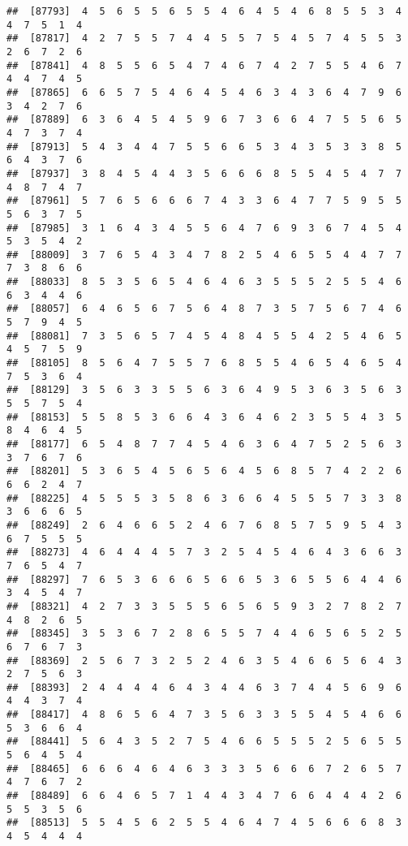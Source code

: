 \documentclass[
]{book}
\begin{document}
\begin{verbatim}
##  [87793]  4  5  6  5  5  6  5  5  4  6  4  5  4  6  8  5  5  3  4  4  7  5  1  4
##  [87817]  4  2  7  5  5  7  4  4  5  5  7  5  4  5  7  4  5  5  3  2  6  7  2  6
##  [87841]  4  8  5  5  6  5  4  7  4  6  7  4  2  7  5  5  4  6  7  4  4  7  4  5
##  [87865]  6  6  5  7  5  4  6  4  5  4  6  3  4  3  6  4  7  9  6  3  4  2  7  6
##  [87889]  6  3  6  4  5  4  5  9  6  7  3  6  6  4  7  5  5  6  5  4  7  3  7  4
##  [87913]  5  4  3  4  4  7  5  5  6  6  5  3  4  3  5  3  3  8  5  6  4  3  7  6
##  [87937]  3  8  4  5  4  4  3  5  6  6  6  8  5  5  4  5  4  7  7  4  8  7  4  7
##  [87961]  5  7  6  5  6  6  6  7  4  3  3  6  4  7  7  5  9  5  5  5  6  3  7  5
##  [87985]  3  1  6  4  3  4  5  5  6  4  7  6  9  3  6  7  4  5  4  5  3  5  4  2
##  [88009]  3  7  6  5  4  3  4  7  8  2  5  4  6  5  5  4  4  7  7  7  3  8  6  6
##  [88033]  8  5  3  5  6  5  4  6  4  6  3  5  5  5  2  5  5  4  6  6  3  4  4  6
##  [88057]  6  4  6  5  6  7  5  6  4  8  7  3  5  7  5  6  7  4  6  5  7  9  4  5
##  [88081]  7  3  5  6  5  7  4  5  4  8  4  5  5  4  2  5  4  6  5  4  5  7  5  9
##  [88105]  8  5  6  4  7  5  5  7  6  8  5  5  4  6  5  4  6  5  4  7  5  3  6  4
##  [88129]  3  5  6  3  3  5  5  6  3  6  4  9  5  3  6  3  5  6  3  5  5  7  5  4
##  [88153]  5  5  8  5  3  6  6  4  3  6  4  6  2  3  5  5  4  3  5  8  4  6  4  5
##  [88177]  6  5  4  8  7  7  4  5  4  6  3  6  4  7  5  2  5  6  3  3  7  6  7  6
##  [88201]  5  3  6  5  4  5  6  5  6  4  5  6  8  5  7  4  2  2  6  6  6  2  4  7
##  [88225]  4  5  5  5  3  5  8  6  3  6  6  4  5  5  5  7  3  3  8  3  6  6  6  5
##  [88249]  2  6  4  6  6  5  2  4  6  7  6  8  5  7  5  9  5  4  3  6  7  5  5  5
##  [88273]  4  6  4  4  4  5  7  3  2  5  4  5  4  6  4  3  6  6  3  7  6  5  4  7
##  [88297]  7  6  5  3  6  6  6  5  6  6  5  3  6  5  5  6  4  4  6  3  4  5  4  7
##  [88321]  4  2  7  3  3  5  5  5  6  5  6  5  9  3  2  7  8  2  7  4  8  2  6  5
##  [88345]  3  5  3  6  7  2  8  6  5  5  7  4  4  6  5  6  5  2  5  6  7  6  7  3
##  [88369]  2  5  6  7  3  2  5  2  4  6  3  5  4  6  6  5  6  4  3  2  7  5  6  3
##  [88393]  2  4  4  4  4  6  4  3  4  4  6  3  7  4  4  5  6  9  6  4  4  3  7  4
##  [88417]  4  8  6  5  6  4  7  3  5  6  3  3  5  5  4  5  4  6  6  5  3  6  6  4
##  [88441]  5  6  4  3  5  2  7  5  4  6  6  5  5  5  2  5  6  5  5  5  6  4  5  4
##  [88465]  6  6  6  4  6  4  6  3  3  3  5  6  6  6  7  2  6  5  7  4  7  6  7  2
##  [88489]  6  6  4  6  5  7  1  4  4  3  4  7  6  6  4  4  4  2  6  5  5  3  5  6
##  [88513]  5  5  4  5  6  2  5  5  4  6  4  7  4  5  6  6  6  8  3  4  5  4  4  4

\end{verbatim}
\end{document}
